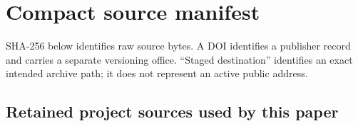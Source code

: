\hypertarget{appendix-c.-compact-source-manifest}{%
\section{Compact source manifest}\label{appendix-c.-compact-source-manifest}}

SHA-256 below identifies raw source bytes. A DOI identifies a publisher record and carries a separate versioning office. ``Staged destination'' identifies an exact intended archive path; it does not represent an active public address.

\hypertarget{c.1.-retained-project-sources-used-by-this-paper}{%
\subsection{Retained project sources used by this paper}\label{c.1.-retained-project-sources-used-by-this-paper}}

